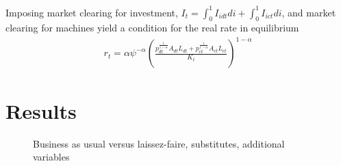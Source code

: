Imposing market clearing for investment, $I_t=\int_{0}^{1}I_{idt}di+\int_{0}^{1}I_{ict}di$, and market clearing for machines yield a condition for the real rate in equilibrium
\begin{align*}
r_t=\alpha \psi^{-\alpha}\left(\frac{p_{dt}^{\frac{1}{1-\alpha}}A_{dt}L_{dt}+p_{ct}^{\frac{1}{1-\alpha}}A_{ct}L_{ct}}{K_t}\right)^{1-\alpha}
\end{align*}

\section{Results}
\begin{figure}[h!!]
	\centering
	\caption{Business as usual versus laissez-faire, substitutes, additional variables }\label{fig:onlyBAU_add}
	

\end{figure}
